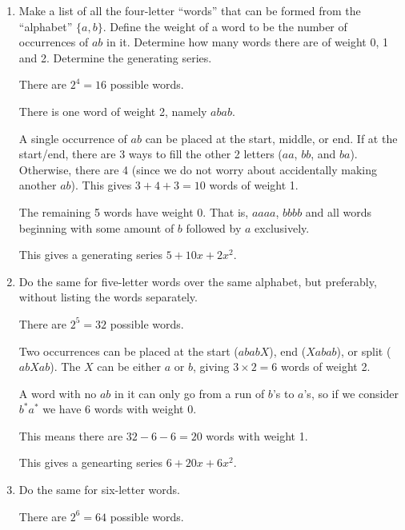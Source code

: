 \begin{xca}\end{xca}
\begin{enumerate}
  \item Make a list of all the four-letter ``words''
        that can be formed from the ``alphabet'' $\{a, b\}$.
        Define the weight of a word to be the number of occurrences of $ab$ in it.
        Determine how many words there are of weight 0, 1 and 2.
        Determine the generating series.
        \begin{sol}
          There are $2^4 = 16$ possible words.

          There is one word of weight 2, namely $abab$.

          A single occurrence of $ab$ can be placed at the start, middle, or end.
          If at the start/end, there are 3 ways to fill the other 2 letters ($aa$, $bb$, and $ba$).
          Otherwise, there are 4 (since we do not worry about accidentally making another $ab$).
          This gives $3+4+3 = 10$ words of weight 1.

          The remaining 5 words have weight 0. That is, $aaaa$, $bbbb$ and all words beginning with some amount of $b$ followed by $a$ exclusively. 

          This gives a generating series $5 + 10x + 2x^2$.
        \end{sol}
  \item Do the same for five-letter words over the same alphabet, but preferably,
        without listing the words separately.
        \begin{sol}
          There are $2^5 = 32$ possible words.

          Two occurrences can be placed at the start ($ababX$), end ($Xabab$), or split ($abXab$).
          The $X$ can be either $a$ or $b$, giving $3 \times 2 = 6$ words of weight 2.

          A word with no $ab$ in it can only go from a run of $b$'s to $a$'s,
          so if we consider $b^* a^*$ we have 6 words with weight 0.

          This means there are $32 - 6 - 6 = 20$ words with weight 1.

          This gives a genearting series $6 + 20x + 6x^2$.
        \end{sol}
  \item Do the same for six-letter words.
        \begin{sol}
          There are $2^6 = 64$ possible words.


\end{sol}
\end{enumerate}

